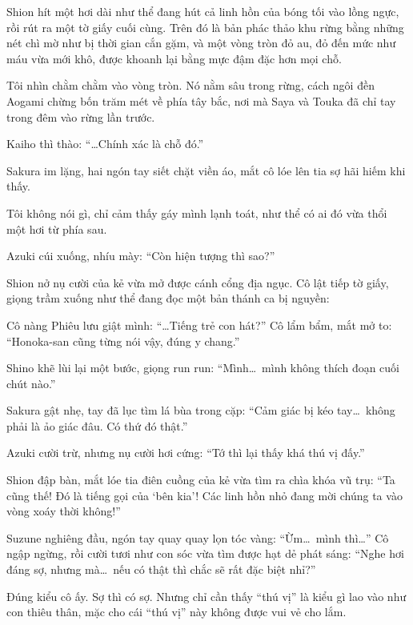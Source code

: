 \documentclass[../main.tex]{subfiles}
\begin{document}
Shion hít một hơi dài như thể đang hút cả linh hồn của bóng tối vào lồng ngực, rồi rút ra một tờ giấy cuối cùng. Trên đó là bản phác thảo khu rừng bằng những nét chì mờ như bị thời gian cắn gặm, và một vòng tròn đỏ au, đỏ đến mức như máu vừa mới khô, được khoanh lại bằng mực đậm đặc hơn mọi chỗ.


Tôi nhìn chằm chằm vào vòng tròn. Nó nằm sâu trong rừng, cách ngôi đền Aogami chừng bốn trăm mét về phía tây bắc, nơi mà Saya và Touka đã chỉ tay trong đêm vào rừng lần trước.

Kaiho thì thào:  ``\dots Chính xác là chỗ đó.''

Sakura im lặng, hai ngón tay siết chặt viền áo, mắt cô lóe lên tia sợ hãi hiếm khi thấy.

Tôi không nói gì, chỉ cảm thấy gáy mình lạnh toát, như thể có ai đó vừa thổi một hơi từ phía sau.

Azuki cúi xuống, nhíu mày: ``Còn hiện tượng thì sao?''

Shion nở nụ cười của kẻ vừa mở được cánh cổng địa ngục. Cô lật tiếp tờ giấy, giọng trầm xuống như thể đang đọc một bản thánh ca bị nguyền:


Cô nàng Phiêu lưu giật mình: ``\dots Tiếng trẻ con hát?'' Cô lẩm bẩm, mắt mở to: ``Honoka-san cũng từng nói vậy, đúng y chang.''

Shino khẽ lùi lại một bước, giọng run run: ``Mình\dots\ mình không thích đoạn cuối chút nào.''

Sakura gật nhẹ, tay đã lục tìm lá bùa trong cặp: ``Cảm giác bị kéo tay\dots\ không phải là ảo giác đâu. Có thứ đó thật.''

Azuki cười trừ, nhưng nụ cười hơi cứng:  ``Tớ thì lại thấy khá thú vị đấy.''

Shion đập bàn, mắt lóe tia điên cuồng của kẻ vừa tìm ra chìa khóa vũ trụ: ``Ta cũng thế! Đó là tiếng gọi của `bên kia'! Các linh hồn nhỏ đang mời chúng ta vào vòng xoáy thời không!''

Suzune nghiêng đầu, ngón tay quay quay lọn tóc vàng: ``Ừm\dots\ mình thì\dots'' Cô ngập ngừng, rồi cười tươi như con sóc vừa tìm được hạt dẻ phát sáng: ``Nghe hơi đáng sợ, nhưng mà\dots\ nếu có thật thì chắc sẽ rất đặc biệt nhỉ?''

Đúng kiểu cô ấy. Sợ thì có sợ. Nhưng chỉ cần thấy ``thú vị'' là kiểu gì lao vào như con thiêu thân, mặc cho cái ``thú vị'' này không được vui vẻ cho lắm.
\end{document}
